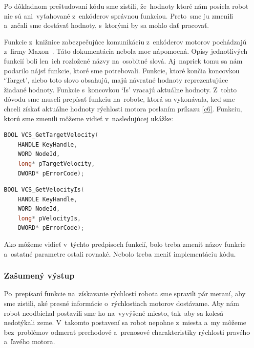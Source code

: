 Po dôkladnom preštudovaní kódu sme zistili, že~hodnoty ktoré nám posiela robot nie sú ani~vyťahované z~enkóderov správnou funkciou. Preto~sme ju
zmenili a~začali sme dostávať hodnoty, s~ktorými by sa mohlo dať pracovať.

Funkcie z~knižnice zabezpečujúce komunikáciu z~enkóderov motorov pochádzajú z~firmy Maxon~\cite{EPOSdoc}. Táto dokumentácia nebola moc nápomocná.
Opisy jednotlivých funkcií boli len~ich rozložené názvy na~osobitné slová. Aj~napriek tomu sa nám podarilo nájsť funkcie, ktoré sme potrebovali.
Funkcie, ktoré končia koncovkou `Target', alebo toto slovo obsahujú, majú návratné hodnoty reprezentujúce žiadané hodnoty. Funkcie s~koncovkou
`Is' vracajú aktuálne hodnoty. Z~tohto dôvodu sme museli prepísať funkciu na~robote, ktorá sa vykonávala, keď sme chceli získať aktuálne hodnoty
rýchlosti motora poslaním príkazu \ref{c6}. Funkciu, ktorú sme zmenili môžeme vidieť v~nasledujúcej ukážke:


\label{VelocityIs}
\begin{lstlisting}[language=C++]
BOOL VCS_GetTargetVelocity(
	HANDLE KeyHandle,
	WORD NodeId,
	long* pTargetVelocity,
	DWORD* pErrorCode);
\end{lstlisting}

\begin{lstlisting}[language=C++]
BOOL VCS_GetVelocityIs(
	HANDLE KeyHandle,
	WORD NodeId,
	long* pVelocityIs,
	DWORD* pErrorCode);
\end{lstlisting}

\noindent Ako môžeme vidieť v~týchto predpisoch funkcií, bolo treba zmeniť názov funkcie a~ostatné parametre ostali rovnaké.
Nebolo treba meniť implementáciu kódu.

\subsubsection{Zašumený výstup}

Po~prepísaní funkcie na~získavanie rýchlostí robota sme spravili pár meraní, aby sme zistili, aké presné informácie o~rýchlostiach
motorov dostávame. Aby nám robot neodbiehal postavili sme ho na~vyvýšené miesto, tak~aby sa kolesá nedotýkali zeme. V~takomto
postavení sa robot nepohne z~miesta a~my môžeme bez~problémov odmerať prechodové a~prenosové charakteristiky rýchlosti pravého
a~ľavého motora.

